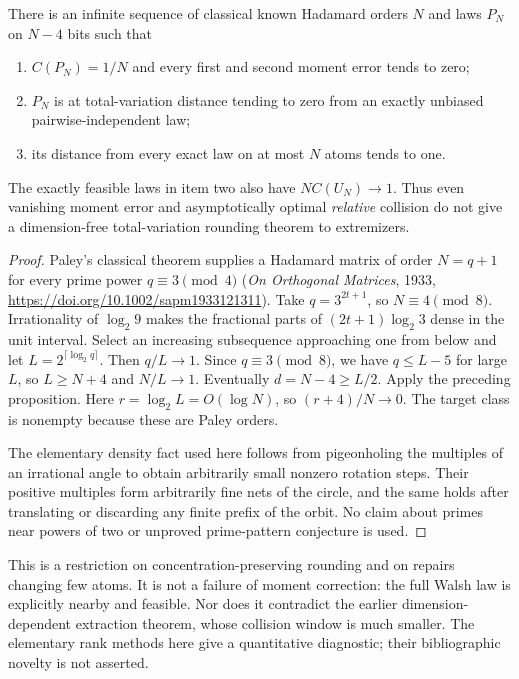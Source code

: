 \begin{theorem}
\label{thm:rank-asymptotic}
There is an infinite sequence of classical known Hadamard orders $N$
and laws $P_N$ on $N-4$ bits such that
\begin{enumerate}
\item $C(P_N)=1/N$ and every first and second moment error tends to zero;
\item $P_N$ is at total-variation distance tending to zero from an
exactly unbiased pairwise-independent law;
\item its distance from every exact law on at most $N$ atoms tends to one.
\end{enumerate}
The exactly feasible laws in item two also have
$N C(U_N)\longrightarrow1$. Thus even vanishing moment error and
asymptotically optimal \emph{relative} collision do not give a
dimension-free total-variation rounding theorem to extremizers.
\end{theorem}
\begin{proof}
Paley's classical theorem supplies a Hadamard matrix of order
$N=q+1$ for every prime power $q\equiv3\pmod4$
(\emph{On Orthogonal Matrices}, 1933,
\url{https://doi.org/10.1002/sapm1933121311}).
Take $q=3^{2t+1}$, so $N\equiv4\pmod8$.
Irrationality of $\log_2 9$ makes the fractional parts of
$(2t+1)\log_2 3$ dense in the unit interval. Select an increasing
subsequence approaching one from below and let
$L=2^{\lceil\log_2 q\rceil}$. Then $q/L\to1$. Since $q\equiv3\pmod8$,
we have $q\le L-5$ for large $L$, so $L\ge N+4$ and $N/L\to1$.
Eventually $d=N-4\ge L/2$. Apply the preceding proposition.
Here $r=\log_2 L=O(\log N)$, so $(r+4)/N\to0$.
The target class is nonempty because these are Paley orders.

The elementary density fact used here follows from pigeonholing the
multiples of an irrational angle to obtain arbitrarily small nonzero
rotation steps. Their positive multiples form arbitrarily fine nets
of the circle, and the same holds after translating or discarding any
finite prefix of the orbit. No claim about primes near powers of two
or unproved prime-pattern conjecture is used.
\end{proof}

This is a restriction on concentration-preserving rounding and on
repairs changing few atoms. It is not a failure of moment correction:
the full Walsh law is explicitly nearby and feasible. Nor does it
contradict the earlier dimension-dependent extraction theorem, whose
collision window is much smaller. The elementary rank methods here
give a quantitative diagnostic; their bibliographic novelty is not
asserted.
